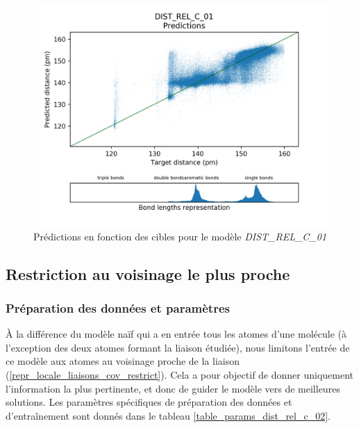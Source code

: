 \begin{figure}
	\centering
	
	\includegraphics[scale=0.7]{../figures/DIST_REL_C_01/DIST_REL_C_01_preds_targets.png}	
	
	\caption{Prédictions en fonction des cibles pour le modèle \emph{DIST\_REL\_C\_01}}
	\label{fpreds_targets_dist_rel_c_01}
\end{figure}

\subsection{Restriction au voisinage le plus proche}

\label{dist_rel_c_restriction}


\subsubsection{Préparation des données et paramètres}
À la différence du modèle naïf qui a en entrée tous les atomes d'une molécule (à l'exception des deux atomes formant la liaison étudiée), nous limitons l'entrée de ce modèle aux atomes au voisinage proche de la liaison (\ref{repr_locale_liaisons_cov_restrict}). Cela a pour objectif de donner uniquement l'information la plus pertinente, et donc de guider le modèle vers de meilleures solutions. Les paramètres spécifiques de préparation des données et d'entraînement sont donnés dans le tableau \ref{table_params_dist_rel_c_02}.

